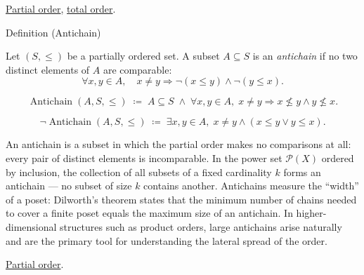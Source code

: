 \begin{dependencies}
\hyperref[def:lattice-order-partial-order]{Partial order},
\hyperref[def:lattice-order-total-order]{total order}.
\end{dependencies}


\begin{definitionbox}{Definition (Antichain)}
\begin{definition}[Antichain]
\label{def:antichain}
Let $(S, \leq)$ be a partially ordered set.  A subset $A \subseteq S$ is
an \emph{antichain} if no two distinct elements of $A$ are comparable:
\[
\forall x, y \in A, \quad x \neq y \Longrightarrow \neg(x \leq y) \land \neg(y \leq x).
\]
\end{definition}
\end{definitionbox}

\begin{remark*}
\[
\operatorname{Antichain}(A, S, \leq)
\;\coloneqq\;
A \subseteq S
\;\land\;
\forall x, y \in A,\; x \neq y \Rightarrow x \not\leq y \land y \not\leq x.
\]
\end{remark*}

\begin{remark*}
\[
\neg\operatorname{Antichain}(A, S, \leq)
\;\coloneqq\;
\exists x, y \in A,\; x \neq y \land (x \leq y \lor y \leq x).
\]
\end{remark*}

\begin{remark*}[Interpretation]
An antichain is a subset in which the partial order makes no comparisons at
all: every pair of distinct elements is incomparable.  In the power set
$\mathcal{P}(X)$ ordered by inclusion, the collection of all subsets of
a fixed cardinality $k$ forms an antichain --- no subset of size $k$ contains
another.  Antichains measure the ``width'' of a poset: Dilworth's theorem
states that the minimum number of chains needed to cover a finite poset
equals the maximum size of an antichain.  In higher-dimensional structures
such as product orders, large antichains arise naturally and are the primary
tool for understanding the lateral spread of the order.
\end{remark*}

\begin{dependencies}
\hyperref[def:lattice-order-partial-order]{Partial order}.
\end{dependencies}
